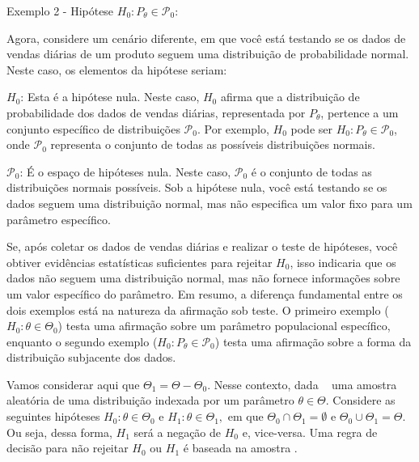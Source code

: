 \documentclass[12pt]{beamer}
\begin{document}
\begin{frame}{}
\begin{block}{}
\justifying
Exemplo 2 - Hipótese $H_{0}: P_{\theta} \in \mathcal{P}_{0}$:
\end{block}
\pause
\begin{block}{}
\justifying
Agora, considere um cenário diferente, em que você está testando se os dados de vendas diárias de um produto seguem uma distribuição de probabilidade normal. Neste caso, os elementos da hipótese seriam:

\begin{block}{}
\justifying
$H_{0}$: Esta é a hipótese nula. Neste caso, $H_{0}$ afirma que a distribuição de probabilidade dos dados de vendas diárias, representada por $P_{\theta}$, pertence a um conjunto específico de distribuições $\mathcal{P}_{0}$. Por exemplo, $H_{0}$ pode ser $H_{0}: P_{\theta} \in \mathcal{P}_{0}$, onde $\mathcal{P}_{0}$ representa o conjunto de todas as possíveis distribuições normais.
\end{block}
\pause
\begin{block}{}
\justifying
$\mathcal{P}_{0}$: É o espaço de hipóteses nula. Neste caso, $\mathcal{P}_{0}$ é o conjunto de todas as distribuições normais possíveis. Sob a hipótese nula, você está testando se os dados seguem uma distribuição normal, mas não especifica um valor fixo para um parâmetro específico.
\end{block}

\end{block}
\end{frame}

\begin{frame}{}
\begin{block}{}
\justifying
Se, após coletar os dados de vendas diárias e realizar o teste de hipóteses, você obtiver evidências estatísticas suficientes para rejeitar $H_{0}$, isso indicaria que os dados não seguem uma distribuição normal, mas não fornece informações sobre um valor específico do parâmetro. Em resumo, a diferença fundamental entre os dois exemplos está na natureza da afirmação sob teste. O primeiro exemplo ($H_{0}: \theta \in \Theta_{0}$) testa uma afirmação sobre um parâmetro populacional específico, enquanto o segundo exemplo ($H_{0}: P_{\theta} \in \mathcal{P}_{0}$) testa uma afirmação sobre a forma da distribuição subjacente dos dados.
\end{block}
\end{frame}

\begin{frame}{}
\begin{block}{}
\justifying
Vamos considerar aqui que $\Theta_{1}=\Theta-\Theta_{0}.$ Nesse contexto, dada \seqX~ uma amostra aleatória de uma distribuição indexada por um parâmetro $\theta\in \Theta.$ Considere as seguintes hipóteses $H_{0}:\theta\in \Theta_{0}$ e $H_{1}:\theta\in \Theta_{1},$ em que $\Theta_{0}\cap\Theta_{1}=\emptyset$ e $\Theta_{0}\cup\Theta_{1}=\Theta.$
Ou seja, dessa forma, $H_{1}$ será a negação de $H_{0}$ e, vice-versa. Uma regra de decisão para não rejeitar $H_{0}$ ou $H_{1}$ é baseada na amostra \seqX.
\end{block}
\end{frame}
\end{document}
